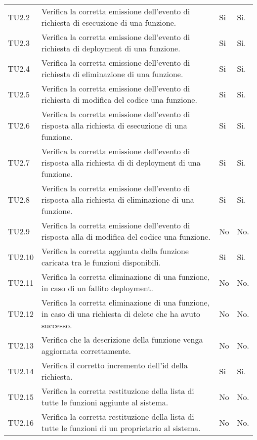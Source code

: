 \begin{longtable}{
		>{\centering}p{}
		>{}p{}
		>{\centering}p{}
		>{\centering}p{} }
		TU2.2   &  Verifica la corretta emissione dell'evento di richiesta di esecuzione di una funzione. &
		Si & Si. \tabularnewline

		TU2.3   &  Verifica la corretta emissione dell'evento di richiesta di deployment di una funzione. &
		Si & Si. \tabularnewline

		TU2.4   &  Verifica la corretta emissione dell'evento di richiesta di eliminazione di una funzione. &
		Si & Si. \tabularnewline

		TU2.5   &  Verifica la corretta emissione dell'evento di richiesta di modifica del codice una funzione. &
		Si & Si. \tabularnewline

		TU2.6   &  Verifica la corretta emissione dell'evento di risposta alla richiesta di esecuzione di una funzione. &
		Si & Si. \tabularnewline

		TU2.7   &  Verifica la corretta emissione dell'evento di risposta alla richiesta di di deployment di una funzione. &
		Si & Si. \tabularnewline

		TU2.8   &  Verifica la corretta emissione dell'evento di risposta alla richiesta di eliminazione di una funzione. &
		Si & Si. \tabularnewline

		TU2.9   &  Verifica la corretta emissione dell'evento di risposta alla di modifica del codice una funzione. &
		No & No. \tabularnewline

		TU2.10  &  Verifica la corretta aggiunta della funzione caricata tra le funzioni disponibili. &
		Si & Si. \tabularnewline

		TU2.11  &  Verifica la corretta eliminazione di una funzione, in caso di un fallito deployment. &
		No & No. \tabularnewline

		TU2.12  &  Verifica la corretta eliminazione di una funzione, in caso di una richiesta di delete che ha avuto successo. &
		No & No. \tabularnewline

		TU2.13  &  Verifica che la descrizione della funzione venga aggiornata correttamente. &
		No & No. \tabularnewline

		TU2.14  &  Verifica il corretto incremento dell'id della richiesta. &
		Si & Si. \tabularnewline

		TU2.15  &  Verifica la corretta restituzione della lista di tutte le funzioni aggiunte al sistema. &
		No & No. \tabularnewline

		TU2.16  &  Verifica la corretta restituzione della lista di tutte le funzioni di un proprietario al sistema. &
		No & No. \tabularnewline


\end{longtable}
